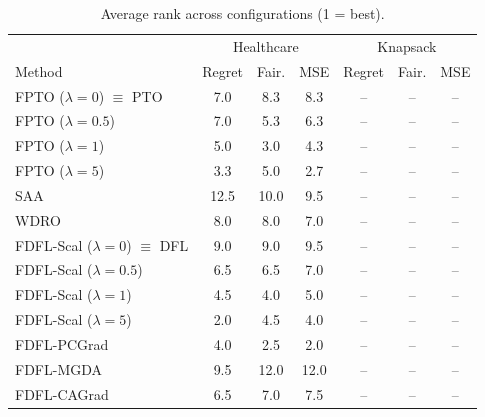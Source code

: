 \begin{table}[htbp]
\centering
\caption{Average rank across configurations (1 = best).}
\label{tab:summary}
\small
\begin{tabular}{l|ccc|ccc}
\toprule
 & \multicolumn{3}{c|}{Healthcare} & \multicolumn{3}{c}{Knapsack} \\
Method & Regret & Fair. & MSE & Regret & Fair. & MSE \\
\midrule
FPTO ($\lambda=0$) $\equiv$ PTO & 7.0 & 8.3 & 8.3 & -- & -- & -- \\
FPTO ($\lambda=0.5$) & 7.0 & 5.3 & 6.3 & -- & -- & -- \\
FPTO ($\lambda=1$) & 5.0 & 3.0 & 4.3 & -- & -- & -- \\
FPTO ($\lambda=5$) & 3.3 & 5.0 & 2.7 & -- & -- & -- \\
\midrule
SAA & 12.5 & 10.0 & 9.5 & -- & -- & -- \\
WDRO & 8.0 & 8.0 & 7.0 & -- & -- & -- \\
\midrule
FDFL-Scal ($\lambda=0$) $\equiv$ DFL & 9.0 & 9.0 & 9.5 & -- & -- & -- \\
FDFL-Scal ($\lambda=0.5$) & 6.5 & 6.5 & 7.0 & -- & -- & -- \\
FDFL-Scal ($\lambda=1$) & 4.5 & 4.0 & 5.0 & -- & -- & -- \\
FDFL-Scal ($\lambda=5$) & 2.0 & 4.5 & 4.0 & -- & -- & -- \\
\midrule
FDFL-PCGrad & 4.0 & 2.5 & 2.0 & -- & -- & -- \\
FDFL-MGDA & 9.5 & 12.0 & 12.0 & -- & -- & -- \\
FDFL-CAGrad & 6.5 & 7.0 & 7.5 & -- & -- & -- \\
\bottomrule
\end{tabular}
\end{table}